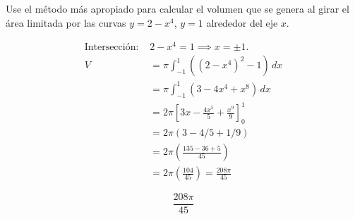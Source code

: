 Use el método más apropiado para calcular el volumen que se genera al girar el área limitada por las curvas $y=2-x^4$, $y=1$ alrededor del eje $x$.

\nopagebreak
\begin{align*}
\text{Intersección: } & 2-x^4=1 \implies x=\pm 1. \\
V &= \pi \int_{-1}^{1} ((2-x^4)^2 - 1) \, dx \\
&= \pi \int_{-1}^{1} (3 - 4x^4 + x^8) \, dx \\
&= 2\pi \left[ 3x - \frac{4x^5}{5} + \frac{x^9}{9} \right]_{0}^{1} \\
&= 2\pi (3 - 4/5 + 1/9) \\
&= 2\pi (\frac{135 - 36 + 5}{45}) \\
&= 2\pi (\frac{104}{45}) = \frac{208\pi}{45}
\end{align*}

\[
\boxed{\displaystyle \frac{208\pi}{45}}
\]
